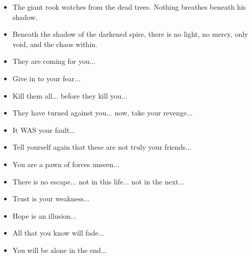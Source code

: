 \begin{multicols}{2}
\begin{itemize}
		\item The giant rook watches from the dead trees. Nothing breathes beneath his shadow.
		\item Beneath the shadow of the darkened spire, there is no light, no mercy, only void, and the chaos within. 
		\item They are coming for you...
		\item Give in to your fear...
		\item Kill them all... before they kill you...
		\item They have turned against you... now, take your revenge...
		\item It WAS your fault...
		\item Tell yourself again that these are not truly your friends...
		\item You are a pawn of forces unseen...
		\item There is no escape... not in this life... not in the next... 
		\item Trust is your weakness...
		\item Hope is an illusion...
		\item All that you know will fade...
		\item You will be alone in the end... 
	\end{itemize}
\end{multicols}

